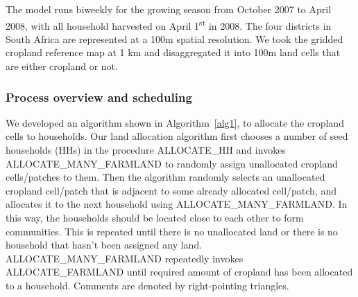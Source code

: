 \documentclass[11pt, titlepage]{article}
\begin{document}
The model runs biweekly for the growing season from October 2007 to April 2008, with all household harvested on April 1\textsuperscript{st} in 2008. The four districts in South Africa are represented at a 100m spatial resolution. We took the gridded cropland reference map at 1 km and disaggregated it into 100m land cells that are either cropland or not. %

\subsubsection{Process overview and scheduling}

We developed an algorithm shown in Algorithm~\ref{alg1}, to allocate the cropland cells to households.  Our land allocation algorithm first chooses a number of seed households (HHs) in the procedure \mbox{ALLOCATE\_HH} and invokes \mbox{ALLOCATE\_MANY\_FARMLAND} to randomly assign unallocated cropland cells/patches to them. Then the algorithm randomly selects an unallocated cropland cell/patch that is adjacent to some already allocated cell/patch, and allocates it to the next household using \mbox{ALLOCATE\_MANY\_FARMLAND}. In this way, the households should be located close to each other to form communities. This is repeated until there is no unallocated land or there is no household that hasn't been assigned any land. \mbox{ALLOCATE\_MANY\_FARMLAND} repeatedly invokes \mbox{ALLOCATE\_FARMLAND} until required amount of cropland has been allocated to a household. Comments are denoted by right-pointing triangles.
\end{document}
